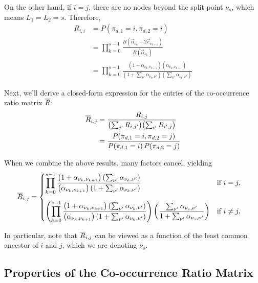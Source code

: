 \documentclass{article}
\theoremstyle{definition}
\begin{document}
On the other hand, if $i = j$, there are no nodes beyond the split point $\nu_s$, which means $L_1 = L_2 = s$.
Therefore,
\begin{align}
R_{i,i}
&= P(\pi_{d,1} = i, \pi_{d,2} = i)
\nonumber
\\
&=
  \prod_{k=0}^{s-1}
  \frac{B(\vec\alpha_{\nu_k} + 2 \vec e_{\nu_{k+1}})}
       {B(\vec\alpha_{\nu_k})}
\nonumber
\\
&=
\prod_{k=0}^{s-1}
\frac{(1 + \alpha_{\nu_k,\nu_{k+1}}) (\alpha_{\nu_k,\nu_{k+1}})}
     {(1 + \sum_{\nu'} \alpha_{\nu_k,\nu'}) (\sum_{\nu'} \alpha_{\nu_k,\nu'})}
\label{eqn:cooccurSame}
\end{align}

Next, we'll derive a closed-form expression for the entries of the co-occurrence ratio matrix $\overline{R}$:
\begin{align*}
\overline{R}_{i,j}
&=
\frac{R_{i,j}}{ \bigl( \sum_{j'} R_{i,j'} \bigr) \bigl( \sum_{i'} R_{i',j} \bigr) }
\\
&=
\frac{P(\pi_{d,1} = i, \pi_{d,2} = j)}
     {P(\pi_{d,1} = i) \, P(\pi_{d,2} = j)}
\end{align*}

When we combine the above results, many factors cancel, yielding
\begin{align}
\overline{R}_{i,j}
&=
\begin{cases}
\displaystyle
\prod_{k=0}^{s-1}
  \frac{ \left( 1 + \alpha_{\nu_k,\nu_{k+1}} \right) \left( \sum_{\nu'} \alpha_{\nu_k, \nu'} \right) }
       { \left( \alpha_{\nu_k,\nu_{k+1}} \right) \left( 1 + \sum_{\nu'} \alpha_{\nu_k, \nu'} \right) }
&
\text{if } i = j,
\\[4ex]
\displaystyle
\left(
  \prod_{k=0}^{s-1}
    \frac{ \left( 1 + \alpha_{\nu_k,\nu_{k+1}} \right) \left( \sum_{\nu'} \alpha_{\nu_k, \nu'} \right) }
         { \left( \alpha_{\nu_k,\nu_{k+1}} \right) \left( 1 + \sum_{\nu'} \alpha_{\nu_k, \nu'} \right) }
\right)
\left(
  \frac{\sum_{\nu'} \alpha_{\nu_s, \nu'}}
       {1 + \sum_{\nu'} \alpha_{\nu_s, \nu'}}
\right)
&
\text{if } i \neq j,
\end{cases}
\label{eqn:closedFormRbar}
\end{align}

In particular, note that $\overline{R}_{i,j}$ can be viewed as a function of the least common ancestor of $i$ and $j$, which we are denoting $\nu_s$.

\subsection{Properties of the Co-occurrence Ratio Matrix}
\end{document}
